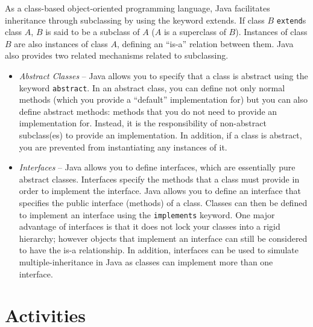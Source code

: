 \documentclass[12pt]{scrartcl}
\begin{document}
As a class-based object-oriented programming language, Java facilitates 
inheritance through subclassing by using the keyword extends.  If class 
$B$ \texttt{extend}s class $A$, $B$ is said to be a subclass 
of $A$ ($A$ is a superclass of $B$).  Instances of class $B$ are also 
instances of class $A$, defining an ``is-a'' relation between them. 
Java also provides two related mechanisms related to subclassing.
\begin{itemize}
  \item \emph{Abstract Classes} -- Java allows you to specify that a 
    class is abstract using the keyword \texttt{abstract}.  
    In an abstract class, you can define not only normal methods (which 
    you provide a ``default'' implementation for) but you can also 
    define abstract methods: methods that you do not need to provide 
    an implementation for.  Instead, it is the responsibility of 
    non-abstract subclass(es) to provide an implementation.  In addition, 
    if a class is abstract, you are prevented from instantiating any 
    instances of it.
  \item \emph{Interfaces} -- Java allows you to define interfaces, 
    which are essentially pure abstract classes.  Interfaces specify 
    the methods that a class must provide in order to implement the 
    interface.  Java allows you to define an interface that specifies 
    the public interface (methods) of a class.  Classes can then be 
    defined to implement an interface using the \texttt{implements} 
    keyword.  One major advantage of interfaces is that it does not 
    lock your classes into a rigid hierarchy; however objects that 
    implement an interface can still be considered to have the is-a 
    relationship.  In addition, interfaces can be used to simulate 
    multiple-inheritance in Java as classes can implement more than 
    one interface. 
\end{itemize}
    
\section*{Activities}
\end{document}
